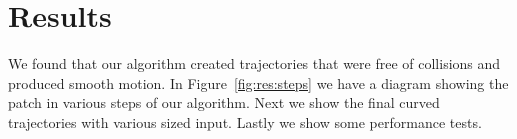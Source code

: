 \section{Results}
\label{sec:results}

We found that our algorithm created trajectories that were free of collisions and produced smooth motion. In Figure~\ref{fig:res:steps} we have a diagram showing the patch in various steps of our algorithm. Next we show the final curved trajectories with various sized input. Lastly we show some performance tests.



